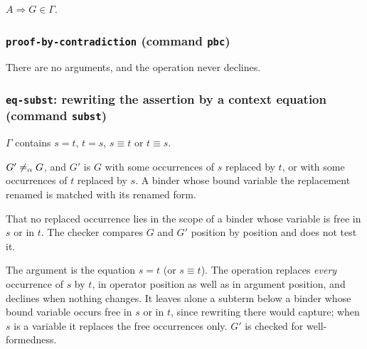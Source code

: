 \label{kop:backchain}%
\begin{VNBcond}
\item[Assumption] $A \Rightarrow G \in \Gamma$.
\end{VNBcond}

\subsubsection*{\texttt{proof-by-contradiction} (command \texttt{pbc})}

\label{kop:proof-by-contradiction}%

There are no arguments, and the operation never declines.

\subsubsection*{\texttt{eq-subst}: rewriting the assertion by a context
  equation (command \texttt{subst})}

\label{kop:eq-subst}%
\begin{VNBcond}
\item[Assumption] $\Gamma$ contains $s = t$, $t = s$, $s \equiv t$ or
  $t \equiv s$.
\item[Replacement] $G' \not=_{\alpha} G$, and $G'$ is $G$ with some
  occurrences of $s$ replaced by $t$, or with some occurrences of $t$
  replaced by $s$.  A binder whose bound variable the replacement renamed
  is matched with its renamed form.
\item[Not checked] That no replaced occurrence lies in the scope of a
  binder whose variable is free in $s$ or in $t$.  The checker compares
  $G$ and $G'$ position by position and does not test it.
\end{VNBcond}
The argument is the equation $s = t$ (or $s \equiv t$).  The operation
replaces \emph{every} occurrence of $s$ by $t$, in operator position as
well as in argument position, and declines when nothing changes.  It
leaves alone a subterm below a binder whose bound variable occurs free in
$s$ or in $t$, since rewriting there would capture; when $s$ is a
variable it replaces the free occurrences only.  $G'$ is checked for
well-formedness.

